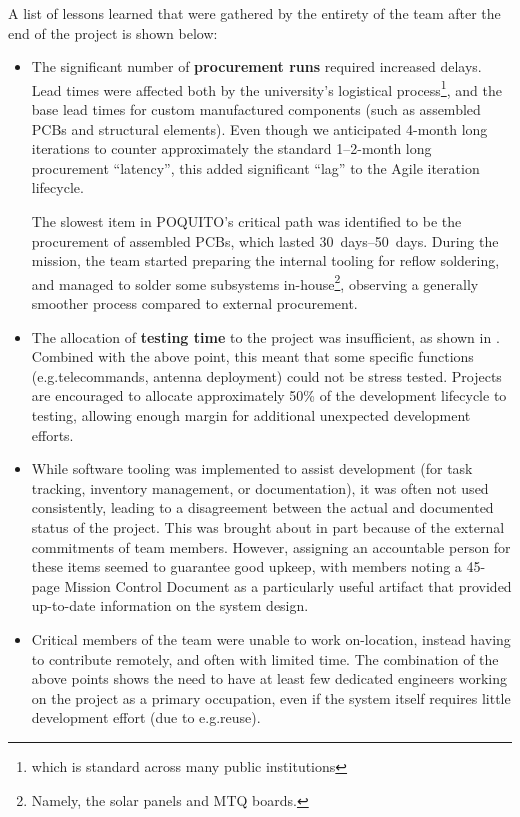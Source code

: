 \documentclass[a4paper,nobib,justified,final]{tufte-book}
\begin{document}
A list of lessons learned that were gathered by the entirety of the team after the end of the project is shown below:
\begin{itemize}
	\item The significant number of \textbf{procurement runs} required increased delays. Lead times were affected both by the university's logistical process\footnote{which is standard across many public institutions}, and the base lead times for custom manufactured components (such as assembled \acsp{PCB} and structural elements). Even though we anticipated 4-month long iterations to counter approximately the standard 1--2-month long procurement ``latency'', this added significant ``lag'' to the Agile iteration lifecycle.
	
	The slowest item in POQUITO's critical path was identified to be the procurement of assembled \acsp{PCB}, which lasted \qtyrange{30}{50}{days}. During the mission, the team started preparing the internal tooling for reflow soldering, and managed to solder some subsystems in-house\footnote{Namely, the solar panels and \acs{MTQ} boards.}, observing a generally smoother process compared to external procurement.
	\item The allocation of \textbf{testing time} to the project was insufficient, as shown in . Combined with the above point, this meant that some specific functions (e.g.\@ telecommands, antenna deployment) could not be stress tested. Projects are encouraged to allocate approximately 50\% of the development lifecycle to testing, allowing enough margin for additional unexpected development efforts.
	\item While software tooling was implemented to assist development (for task tracking, inventory management, or documentation), it was often not used consistently, leading to a disagreement between the actual and documented status of the project. This was brought about in part because of the external commitments of team members. However, assigning an accountable person for these items seemed to guarantee good upkeep, with members noting a 45-page Mission Control Document as a particularly useful artifact that provided up-to-date information on the system design.
	\item Critical members of the team were unable to work on-location, instead having to contribute remotely, and often with limited time. The combination of the above points shows the need to have at least few dedicated engineers working on the project as a primary occupation, even if the system itself requires little development effort (due to e.g.\@ reuse).

\end{itemize}
\end{document}
